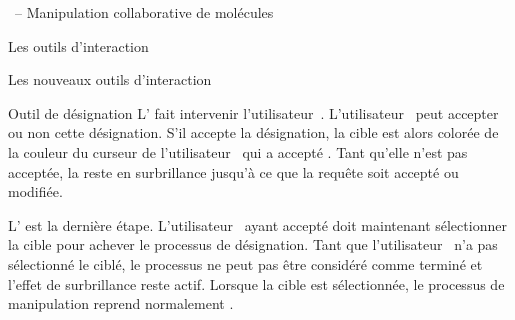 \documentclass[myfrancais]{mythesis}
\begin{document}
\begin{mychapter}{\myShaddock\ -- Manipulation collaborative de molécules}
\begin{mysection}{Les outils d'interaction}
\begin{mysubsection}{Les nouveaux outils d'interaction}
\begin{mysubsubsection}{Outil de désignation}
					L' fait intervenir l'utilisateur~.
					L'utilisateur~ peut accepter ou non cette désignation.
					S'il accepte la désignation, la cible est alors colorée de la couleur du curseur de l'utilisateur~ qui a accepté .
					Tant qu'elle n'est pas acceptée, la  reste en surbrillance jusqu'à ce que la requête soit accepté ou modifiée.

					L' est la dernière étape.
					L'utilisateur~ ayant accepté doit maintenant sélectionner la cible pour achever le processus de désignation.
					Tant que l'utilisateur~ n'a pas sélectionné le  ciblé, le processus ne peut pas être considéré comme terminé et l'effet de surbrillance reste actif.
					Lorsque la cible est sélectionnée, le processus de manipulation reprend normalement .
				\end{mysubsubsection}
			\end{mysubsection}
		\end{mysection}
	\end{mychapter}
\end{document}
